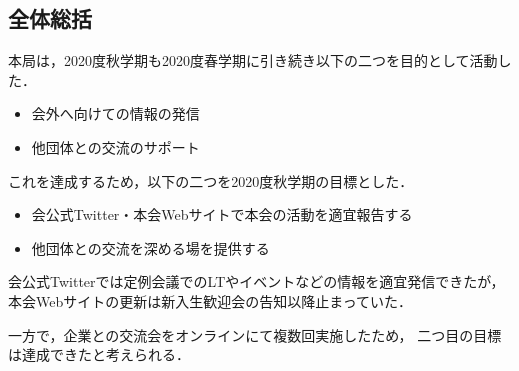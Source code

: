 \subsection*{全体総括}


本局は，2020度秋学期も2020度春学期に引き続き以下の二つを目的として活動した．
\begin{itemize}
    \item 会外へ向けての情報の発信
    \item 他団体との交流のサポート
\end{itemize}
これを達成するため，以下の二つを2020度秋学期の目標とした．
\begin{itemize}
    \item 会公式Twitter・本会Webサイトで本会の活動を適宜報告する
    \item 他団体との交流を深める場を提供する
\end{itemize}

会公式Twitterでは定例会議でのLTやイベントなどの情報を適宜発信できたが，
本会Webサイトの更新は新入生歓迎会の告知以降止まっていた．

一方で，企業との交流会をオンラインにて複数回実施したため，
二つ目の目標は達成できたと考えられる．

